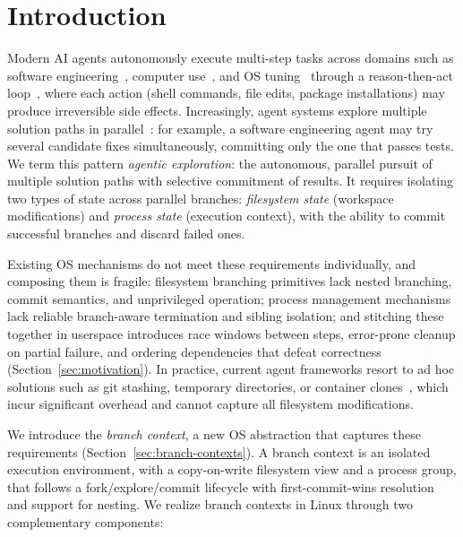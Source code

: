 \documentclass[sigconf]{acmart}
\begin{document}
\section{Introduction}

Modern AI agents autonomously execute multi-step tasks across domains such as software engineering~\cite{swe-agent,openhands,claudecode}, computer use~\cite{wang_llm_agent_survey}, and OS tuning~\cite{kgent} through a reason-then-act loop~\cite{react}, where each action (shell commands, file edits, package installations) may produce irreversible side effects. Increasingly, agent systems explore multiple solution paths in parallel~\cite{tree-of-thoughts,reflexion,swe-agent}: for example, a software engineering agent may try several candidate fixes simultaneously, committing only the one that passes tests. We term this pattern \emph{agentic exploration}: the autonomous, parallel pursuit of multiple solution paths with selective commitment of results. It requires isolating two types of state across parallel branches: \emph{filesystem state} (workspace modifications) and \emph{process state} (execution context), with the ability to commit successful branches and discard failed ones.

Existing OS mechanisms do not meet these requirements individually, and composing them is fragile: filesystem branching primitives lack nested branching, commit semantics, and unprivileged operation; process management mechanisms lack reliable branch-aware termination and sibling isolation; and stitching these together in userspace introduces race windows between steps, error-prone cleanup on partial failure, and ordering dependencies that defeat correctness (Section~\ref{sec:motivation}). In practice, current agent frameworks resort to ad hoc solutions such as git stashing, temporary directories, or container clones~\cite{langchain,autogpt}, which incur significant overhead and cannot capture all filesystem modifications.

We introduce the \emph{branch context}, a new OS abstraction that captures these requirements (Section~\ref{sec:branch-contexts}). A branch context is an isolated execution environment, with a copy-on-write filesystem view and a process group, that follows a fork/explore/commit lifecycle with first-commit-wins resolution and support for nesting. We realize branch contexts in Linux through two complementary components:
\end{document}
